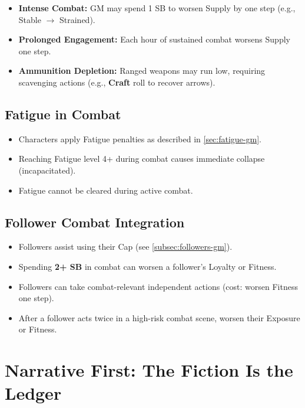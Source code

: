 \begin{itemize}
  \item \textbf{Intense Combat:} GM may spend 1 SB to worsen Supply by one step (e.g., Stable $\rightarrow$ Strained).
  \item \textbf{Prolonged Engagement:} Each hour of sustained combat worsens Supply one step.
  \item \textbf{Ammunition Depletion:} Ranged weapons may run low, requiring scavenging actions (e.g., \textbf{Craft} roll to recover arrows).
\end{itemize}

\subsection{Fatigue in Combat}
\label{subsec:combat-fatigue}

\begin{itemize}
  \item Characters apply Fatigue penalties as described in \ref{sec:fatigue-gm}.
  \item Reaching Fatigue level 4+ during combat causes immediate collapse (incapacitated).
  \item Fatigue cannot be cleared during active combat.
\end{itemize}

\subsection{Follower Combat Integration}
\label{subsec:combat-followers}

\begin{itemize}
  \item Followers assist using their Cap (see \ref{subsec:followers-gm}).
  \item Spending \textbf{2+ SB} in combat can worsen a follower's Loyalty or Fitness.
  \item Followers can take combat-relevant independent actions (cost: worsen Fitness one step).
  \item After a follower acts twice in a high-risk combat scene, worsen their Exposure or Fitness.
\end{itemize}

\section{Narrative First: The Fiction Is the Ledger}
\label{sec:resources-narrative-first}

